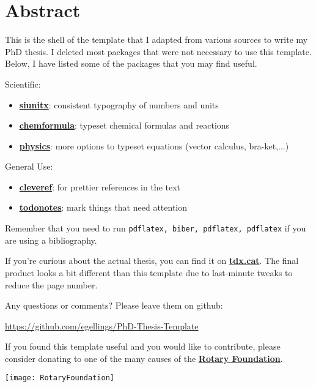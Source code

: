 \chapter*{Abstract}\label{ch:abstract}

This is the shell of the template that I adapted from various sources to write my PhD thesis. I deleted most packages that were not necessary to use this template. Below, I have listed some of the packages that you may find useful.

Scientific:
\begin{itemize}
	\item \textbf{\href{https://ctan.org/pkg/siunitx}{siunitx}}: consistent typography of numbers and units
	\item \textbf{\href{https://ctan.org/pkg/chemformula}{chemformula}}: typeset chemical formulas and reactions
	\item \textbf{\href{https://ctan.org/pkg/physics}{physics}}: more options to typeset equations (vector calculus, bra-ket,...)
\end{itemize}

General Use:
\begin{itemize}
	\item \textbf{\href{https://ctan.org/pkg/cleveref}{cleveref}}: for prettier references in the text
	\item \textbf{\href{https://ctan.org/pkg/todonotes}{todonotes}}: mark things that need attention
\end{itemize}

Remember that you need to run \texttt{pdflatex, biber, pdflatex, pdflatex} if you are using a bibliography.

If you're curious about the actual thesis, you can find it on \textbf{\href{https://www.tdx.cat/handle/10803/668853}{tdx.cat}}. The final product looks a bit different than this template due to last-minute tweaks to reduce the page number.

Any questions or comments? Please leave them on github: 

\url{https://github.com/egellings/PhD-Thesis-Template}

\vfill
If you found this template useful and you would like to contribute, please consider donating to one of the many causes of the \textbf{\href{https://my.rotary.org/en/donate}{Rotary Foundation}}.

\texttt{[image: RotaryFoundation]}